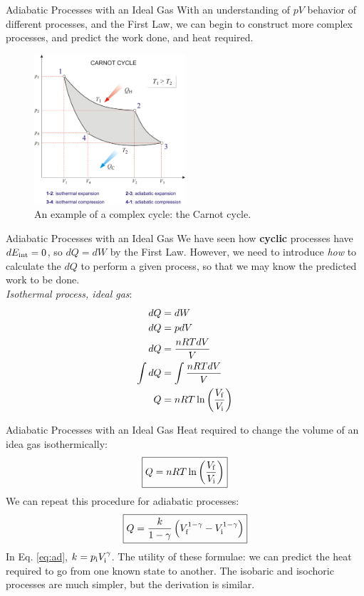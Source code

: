 \documentclass{beamer}
\begin{document}
\begin{frame}{Adiabatic Processes with an Ideal Gas}
\small
With an understanding of $pV$ behavior of different processes, and the First Law, we can begin to construct more complex processes, and predict the work done, and heat required.
\begin{figure}
\centering
\includegraphics[width=0.5\textwidth]{figures/carnot_cycle.png}
\caption{\label{fig:carnot} An example of a complex cycle: the Carnot cycle.}
\end{figure}
\end{frame}

\begin{frame}{Adiabatic Processes with an Ideal Gas}
We have seen how \textbf{cyclic} processes have $dE_{\rm int} = 0$, so $dQ = dW$ by the First Law.  However, we need to introduce \textit{how} to calculate the $dQ$ to perform a given process, so that we may know the predicted work to be done. \\ \vspace{0.5cm}
\textit{Isothermal process, ideal gas}:
\begin{align}
dQ &= dW \\
dQ &= pdV \\
dQ &= \frac{nRT dV}{V} \\
\int dQ &= \int \frac{nRT dV}{V} \\
Q &= nRT \ln\left(\frac{V_{\rm f}}{V_{\rm i}}\right)
\end{align}
\end{frame}

\begin{frame}{Adiabatic Processes with an Ideal Gas}
Heat required to change the volume of an idea gas isothermically:
\begin{equation}
\boxed{Q = nRT \ln\left(\frac{V_{\rm f}}{V_{\rm i}}\right)} \label{eq:isoT}
\end{equation}
We can repeat this procedure for adiabatic processes:
\begin{equation}
\boxed{Q = \frac{k}{1-\gamma}\left(V_{\rm f}^{1-\gamma} - V_{\rm i}^{1-\gamma}\right)} \label{eq:ad}
\end{equation}
In Eq. \ref{eq:ad}, $k = p_{\rm i}V_{\rm i}^\gamma$.  The utility of these formulae: \alert{we can predict the heat required to go from one known state to another}.  The isobaric and isochoric processes are much simpler, but the derivation is similar.
\end{frame}
\end{document}
